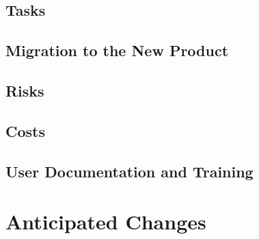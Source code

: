 \documentclass[11pt]{article}
\begin{document}
\subsection{Tasks}

\subsection{Migration to the New Product}

\subsection{Risks}

\subsection{Costs}

\subsection{User Documentation and Training}

\section{Anticipated Changes}
\end{document}
